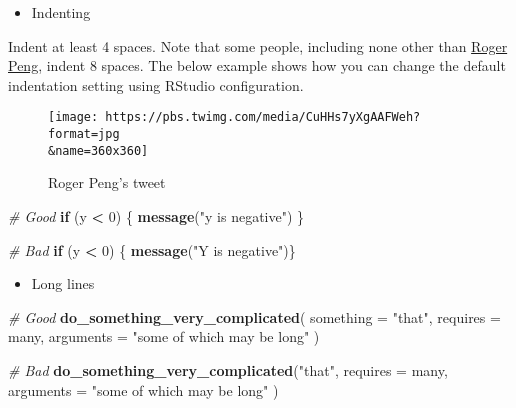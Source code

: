\documentclass[
]{book}
\newenvironment{Shaded}{\begin{snugshade}}{\end{snugshade}}
\newcommand{\CommentTok}[1]{\textcolor[rgb]{0.56,0.35,0.01}{\textit{#1}}}
\newcommand{\ControlFlowTok}[1]{\textcolor[rgb]{0.13,0.29,0.53}{\textbf{#1}}}
\newcommand{\DataTypeTok}[1]{\textcolor[rgb]{0.13,0.29,0.53}{#1}}
\newcommand{\DecValTok}[1]{\textcolor[rgb]{0.00,0.00,0.81}{#1}}
\newcommand{\KeywordTok}[1]{\textcolor[rgb]{0.13,0.29,0.53}{\textbf{#1}}}
\newcommand{\NormalTok}[1]{#1}
\newcommand{\OperatorTok}[1]{\textcolor[rgb]{0.81,0.36,0.00}{\textbf{#1}}}
\newcommand{\StringTok}[1]{\textcolor[rgb]{0.31,0.60,0.02}{#1}}
\providecommand{\tightlist}{%
  \setlength{\itemsep}{0pt}\setlength{\parskip}{0pt}}
\begin{document}
\begin{itemize}
\tightlist
\item
  Indenting
\end{itemize}

Indent at least 4 spaces. Note that some people, including none other than \href{https://simplystatistics.org/2018/07/27/why-i-indent-my-code-8-spaces/}{Roger Peng}, indent 8 spaces. The below example shows how you can change the default indentation setting using RStudio configuration.

\begin{figure}
\centering
\texttt{[image: https://pbs.twimg.com/media/CuHHs7yXgAAFWeh?format=jpg\\\&name=360x360]}
\caption{Roger Peng's tweet}
\end{figure}

\begin{Shaded}
\begin{Highlighting}[]
\CommentTok{\# Good}
\ControlFlowTok{if}\NormalTok{ (y }\OperatorTok{\textless{}}\StringTok{ }\DecValTok{0}\NormalTok{) \{}
  \KeywordTok{message}\NormalTok{(}\StringTok{"y is negative"}\NormalTok{)}
\NormalTok{\}}

\CommentTok{\# Bad}
\ControlFlowTok{if}\NormalTok{ (y }\OperatorTok{\textless{}}\StringTok{ }\DecValTok{0}\NormalTok{) \{}
\KeywordTok{message}\NormalTok{(}\StringTok{"Y is negative"}\NormalTok{)\}}
\end{Highlighting}
\end{Shaded}

\begin{itemize}
\tightlist
\item
  Long lines
\end{itemize}

\begin{Shaded}
\begin{Highlighting}[]
\CommentTok{\# Good}
\KeywordTok{do\_something\_very\_complicated}\NormalTok{(}
  \DataTypeTok{something =} \StringTok{"that"}\NormalTok{,}
  \DataTypeTok{requires =}\NormalTok{ many,}
  \DataTypeTok{arguments =} \StringTok{"some of which may be long"}
\NormalTok{)}

\CommentTok{\# Bad}
\KeywordTok{do\_something\_very\_complicated}\NormalTok{(}\StringTok{"that"}\NormalTok{, }\DataTypeTok{requires =}\NormalTok{ many, }\DataTypeTok{arguments =}
                              \StringTok{"some of which may be long"}
\NormalTok{                              )}
\end{Highlighting}
\end{Shaded}
\end{document}
